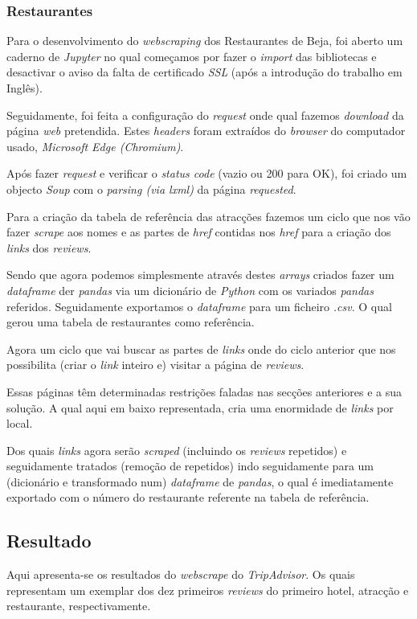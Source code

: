 \subsubsection{Restaurantes}
Para o desenvolvimento do \textit{webscraping} dos Restaurantes de Beja, foi aberto um caderno de \textit{Jupyter} no qual começamos por fazer o \textit{import} das bibliotecas e desactivar o aviso da falta de certificado \textit{SSL} (após a introdução do trabalho em Inglês).

Seguidamente, foi feita a configuração do \textit{request} onde qual fazemos \textit{download} da página \textit{web} pretendida. Estes \textit{headers} foram extraídos do \textit{browser} do computador usado, \textit{Microsoft Edge (Chromium)}.

Após fazer \textit{request} e verificar o \textit{status code} (vazio ou 200 para OK), foi criado um objecto \textit{Soup} com o \textit{parsing (via lxml)} da página \textit{requested}.

Para a criação da tabela de referência das atracções fazemos um ciclo que nos vão fazer \textit{scrape} aos nomes e as partes de \textit{href} contidas nos \textit{href} para a criação dos \textit{links} dos \textit{reviews}.

Sendo que agora podemos simplesmente através destes \textit{arrays} criados fazer um \textit{dataframe} der \textit{pandas} via um dicionário de \textit{Python} com os variados \textit{pandas} referidos. Seguidamente exportamos o \textit{dataframe} para um ficheiro \textit{.csv}. O qual gerou uma tabela de restaurantes como referência.

Agora um ciclo que vai buscar as partes de \textit{links} onde do ciclo anterior que nos possibilita (criar o \textit{link} inteiro e) visitar a página de \textit{reviews}.

Essas páginas têm determinadas restrições faladas nas secções anteriores e a sua solução. A qual aqui em baixo representada, cria uma enormidade de \textit{links} por local.

Dos quais \textit{links} agora serão \textit{scraped} (incluindo os \textit{reviews} repetidos) e seguidamente tratados (remoção de repetidos) indo seguidamente para um (dicionário e transformado num) \textit{dataframe} de \textit{pandas}, o qual é imediatamente exportado com o número do restaurante referente na tabela de referência.


\subsection{Resultado}
Aqui apresenta-se os resultados do \textit{webscrape} do \textit{TripAdvisor}. Os quais representam um exemplar dos dez primeiros \textit{reviews} do primeiro hotel, atracção e restaurante, respectivamente.


